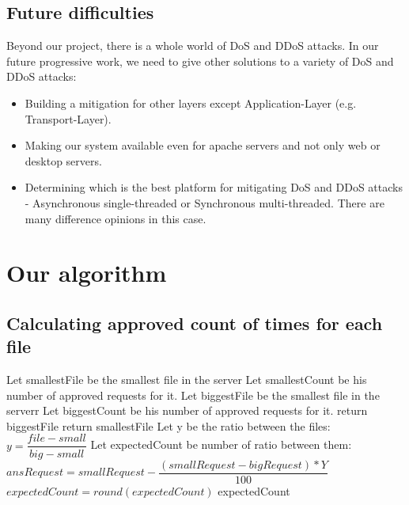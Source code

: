 \documentclass{report}
\begin{document}
\section {Future difficulties}
Beyond our project, there is a whole world of \gls{DoS} and \gls{DDoS} attacks. In our future progressive work, we need to give other solutions to a variety of \gls{DoS} and \gls{DDoS} attacks:
\begin{itemize}
\item Building a mitigation for other layers except Application-Layer (e.g. Transport-Layer).
\item Making our system available even for apache servers and not only web or desktop servers.
\item Determining which is the best platform for mitigating \gls{DoS} and \gls{DDoS} attacks - \hfill \break Asynchronous single-threaded or Synchronous multi-threaded. There are many difference opinions in this case.
\end{itemize}
\newpage
\chapter {Our algorithm}
\section {Calculating approved count of times for each file}
\label{sec:algo1}
  \begin{algorithm}
   \caption{}
    \begin{algorithmic}[1]
        	\State Let smallestFile be the smallest file in the server
	\State Let smallestCount be his number of approved requests for it.
	\State Let biggestFile be the smallest file in the serverr
	\State Let biggestCount be his number of approved requests for it.
                 \State \Return return biggestFile
                \State \Return return smallestFile
            \Else
              	\State Let y be the ratio between the files: $y=\dfrac{file-small}{big - small} $
	 	\State Let expectedCount be number of ratio between them:
  		\State $ansRequest=smallRequest-  \dfrac{(smallRequest-bigRequest)*Y}{100}$
		\State $expectedCount = round( expectedCount )$
	  	\State \Return expectedCount
            \EndIf
       \EndFunction
\end{algorithmic}
\end{algorithm}
\newpage
\end{document}
